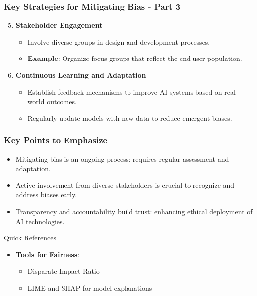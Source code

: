 \documentclass[aspectratio=169]{beamer}
\begin{document}
\begin{frame}[fragile]
    \frametitle{Key Strategies for Mitigating Bias - Part 3}
    \begin{enumerate}
        \setcounter{enumi}{4} %
        \item \textbf{Stakeholder Engagement}
        \begin{itemize}
            \item Involve diverse groups in design and development processes.
            \item \textbf{Example}: Organize focus groups that reflect the end-user population.
        \end{itemize}
        
        \item \textbf{Continuous Learning and Adaptation}
        \begin{itemize}
            \item Establish feedback mechanisms to improve AI systems based on real-world outcomes.
            \item Regularly update models with new data to reduce emergent biases.
        \end{itemize}
    \end{enumerate}
\end{frame}

\begin{frame}[fragile]
    \frametitle{Key Points to Emphasize}
    \begin{itemize}
        \item Mitigating bias is an ongoing process: requires regular assessment and adaptation.
        \item Active involvement from diverse stakeholders is crucial to recognize and address biases early.
        \item Transparency and accountability build trust: enhancing ethical deployment of AI technologies.
    \end{itemize}
    \begin{block}{Quick References}
        \begin{itemize}
            \item \textbf{Tools for Fairness}:
            \begin{itemize}
                \item Disparate Impact Ratio
                \item LIME and SHAP for model explanations
            \end{itemize}
        \end{itemize}
    \end{block}
\end{frame}
\end{document}
